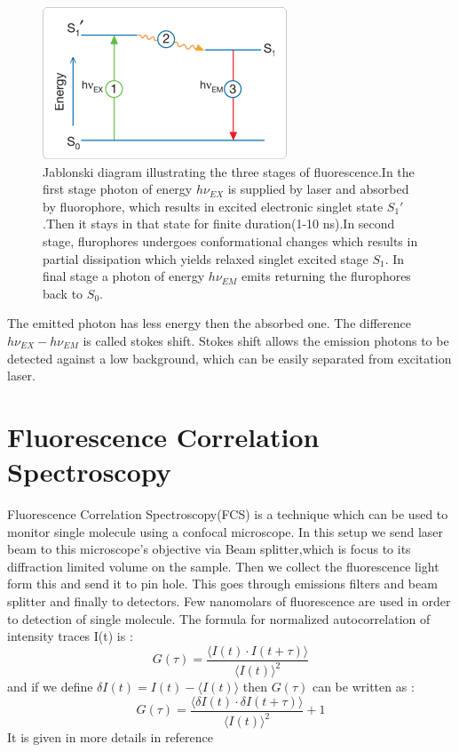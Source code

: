 \documentclass[twoside,single]{lion-msc}
\begin{document}
\begin{figure}[H]
\includegraphics[width=.5\textwidth,center]{2}
\caption  {Jablonski diagram illustrating the three stages of fluorescence.In the first stage photon of energy $h\nu_{EX}$ is supplied by laser and absorbed by  fluorophore, which results in excited electronic singlet state ${S_1}'$.Then it stays in that state for finite duration(1-10 ns).In second stage, flurophores undergoes conformational changes which results in partial dissipation which yields relaxed singlet excited stage $S_1$. In final stage a photon of energy $h\nu_{EM}$ emits returning the flurophores back to $S_0$. \cite{AuNR2}}
\end{figure}

The emitted photon has less energy then the absorbed one. The difference $h\nu_{EX}-h\nu_{EM}$ is called stokes shift. Stokes shift allows the emission photons to be detected against a low background, which can be easily separated from excitation laser.

\section{Fluorescence Correlation Spectroscopy}
Fluorescence Correlation Spectroscopy(FCS) is a technique which can be used to monitor single molecule using a confocal microscope. In this setup we send laser beam to this microscope's objective via Beam splitter,which is focus to its diffraction limited volume on the sample. Then we collect the fluorescence light form this and send it to pin hole. This goes through emissions filters and beam splitter and finally to detectors. Few nanomolars of fluorescence are used in order to detection of single molecule.  The formula for normalized autocorrelation of intensity traces I(t) is :
$$
G(\tau) = \frac{\langle{I(t)}\cdot{I(t+\tau)}\rangle}{\langle{I(t)}\rangle^2} 
$$
and if we define $\delta{I(t)} = I(t) - \langle{I(t)}\rangle$ then $G(\tau)$ can be written as :
$$	
G(\tau) = \frac{\langle\delta{I(t)}\cdot\delta{I(t+\tau)}\rangle}{\langle{I(t)}\rangle^2} +1
$$
It is given in more details in reference \cite{AuNR3}
\end{document}
